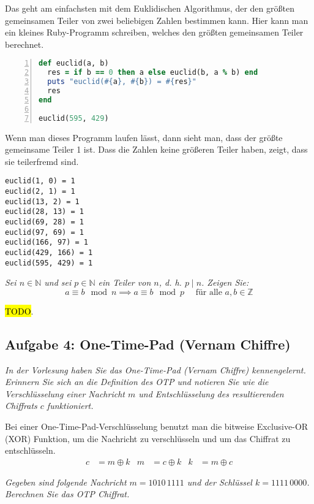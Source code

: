 \documentclass[
  ngerman,
  DIV=12
]{scrartcl}
\begin{document}
\medskip\noindent
Das geht am einfachsten mit dem Euklidischen Algorithmus, der den größten gemeinsamen Teiler von zwei beliebigen Zahlen bestimmen kann. Hier kann man ein kleines Ruby-Programm schreiben, welches den größten gemeinsamen Teiler berechnet.
\begin{lstlisting}[language=ruby,numbers=left]
def euclid(a, b)
  res = if b == 0 then a else euclid(b, a % b) end
  puts "euclid(#{a}, #{b}) = #{res}"
  res
end

euclid(595, 429)  
\end{lstlisting}
Wenn man dieses Programm laufen lässt, dann sieht man, dass der größte gemeinsame Teiler 1 ist. Dass die Zahlen keine größeren Teiler haben, zeigt, dass sie teilerfremd sind.
\begin{lstlisting}
euclid(1, 0) = 1
euclid(2, 1) = 1
euclid(13, 2) = 1
euclid(28, 13) = 1
euclid(69, 28) = 1
euclid(97, 69) = 1
euclid(166, 97) = 1
euclid(429, 166) = 1
euclid(595, 429) = 1  
\end{lstlisting}

\bigskip\noindent
\emph{Sei $n \in \mathbb{N}$ und sei $p \in \mathbb{N}$ ein Teiler von $n$, d. h. $p \mid n$. Zeigen Sie:}
\begin{equation*}
a \equiv b \mod n \implies a \equiv b \mod p \quad\text{ für alle } a, b \in \mathbb{Z}   
\end{equation*}


\medskip\noindent
\hl{TODO}.

\subsection*{Aufgabe 4: One-Time-Pad (Vernam Chiffre)}

\emph{In der Vorlesung haben Sie das One-Time-Pad (Vernam Chiffre) kennengelernt. Erinnern Sie sich an die Definition des OTP und notieren Sie wie die Verschlüsselung einer Nachricht $m$ und Entschlüsselung des resultierenden Chiffrats $c$ funktioniert.}

\medskip\noindent
Bei einer One-Time-Pad-Verschlüsselung benutzt man die bitweise Exclusive-OR (XOR) Funktion, um die Nachricht zu verschlüsseln und um das Chiffrat zu entschlüsseln. 
\begin{align*}
  c &= m \oplus k & m &= c \oplus k & k &= m \oplus c
\end{align*}

\bigskip\noindent
\emph{Gegeben sind folgende Nachricht $m = 1010\,1111$ und der Schlüssel $k = 1111\,0000$. Berechnen Sie das OTP Chiffrat.}
\end{document}
